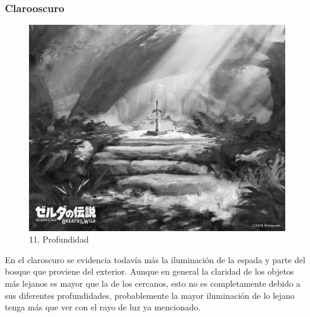 \documentclass[12pt]{article}
\begin{document}
    \subsubsection{Clarooscuro}
        \begin{figure}[H]
      \centering
      \includegraphics[width=\textwidth]{images/Carlos/12/Grises.jpg}
      \caption{\small 11. Profundidad}
    \end{figure}
    En el claroscuro se evidencia todavía más la iluminación de la espada y parte del bosque que proviene del exterior. Aunque en general la claridad de los objetos más lejanos es mayor que la de los cercanos, esto no es completamente debido a sus diferentes profundidades, probablemente la mayor iluminación de lo lejano tenga más que ver con el rayo de luz ya mencionado.
\end{document}
